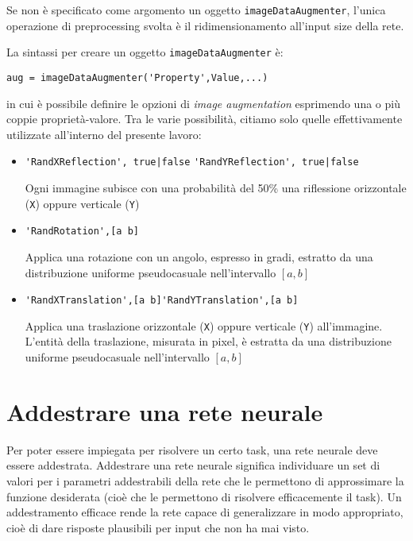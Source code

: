 Se non è specificato come argomento un oggetto \verb|imageDataAugmenter|, l'unica operazione di preprocessing svolta è il ridimensionamento all'input size della rete.

La sintassi per creare un oggetto \verb|imageDataAugmenter| è:

\begin{verbatim}
aug = imageDataAugmenter('Property',Value,...)
\end{verbatim}

in cui è possibile definire le opzioni di \textit{image augmentation} esprimendo una o più coppie proprietà-valore. Tra le varie possibilità, citiamo solo quelle effettivamente utilizzate all'interno del presente lavoro:
\begin{itemize}
	\item \verb+'RandXReflection', true|false+ \newline\vspace{0.1mm}\verb+'RandYReflection', true|false+
	
	Ogni immagine subisce con una probabilità del 50\% una riflessione orizzontale (\verb|X|) oppure verticale (\verb|Y|)
	\item \verb|'RandRotation',[a b]|
	
	Applica una rotazione con un angolo, espresso in gradi, estratto da una distribuzione uniforme pseudocasuale nell'intervallo $[a,b]$
	\item \verb|'RandXTranslation',[a b]|\newline\vspace{0.1mm}\verb|'RandYTranslation',[a b]|
	
	Applica una traslazione orizzontale (\verb|X|) oppure verticale (\verb|Y|) all'immagine. L'entità della traslazione, misurata in pixel, è estratta da una distribuzione uniforme pseudocasuale nell'intervallo $[a,b]$
\end{itemize}

\section{Addestrare una rete neurale}
Per poter essere impiegata per risolvere un certo task, una rete neurale deve essere addestrata. Addestrare una rete neurale significa individuare un set di valori per i parametri addestrabili della rete che le permettono di approssimare la funzione desiderata (cioè che le permettono di risolvere efficacemente il task).
Un addestramento efficace rende la rete capace di generalizzare in modo appropriato, cioè di dare risposte plausibili per input che non ha mai visto.\\

